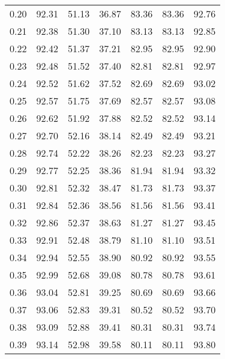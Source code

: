 \begin{tabular}{|c|c|c|c|c|c|c|}
      0.20 &     92.31 &     51.13 &      36.87 &   83.36 &      83.36 &         92.76 \\
      0.21 &     92.38 &     51.30 &      37.10 &   83.13 &      83.13 &         92.85 \\
      0.22 &     92.42 &     51.37 &      37.21 &   82.95 &      82.95 &         92.90 \\
      0.23 &     92.48 &     51.52 &      37.40 &   82.81 &      82.81 &         92.97 \\
      0.24 &     92.52 &     51.62 &      37.52 &   82.69 &      82.69 &         93.02 \\
      0.25 &     92.57 &     51.75 &      37.69 &   82.57 &      82.57 &         93.08 \\
      0.26 &     92.62 &     51.92 &      37.88 &   82.52 &      82.52 &         93.14 \\
      0.27 &     92.70 &     52.16 &      38.14 &   82.49 &      82.49 &         93.21 \\
      0.28 &     92.74 &     52.22 &      38.26 &   82.23 &      82.23 &         93.27 \\
      0.29 &     92.77 &     52.25 &      38.36 &   81.94 &      81.94 &         93.32 \\
      0.30 &     92.81 &     52.32 &      38.47 &   81.73 &      81.73 &         93.37 \\
      0.31 &     92.84 &     52.36 &      38.56 &   81.56 &      81.56 &         93.41 \\
      0.32 &     92.86 &     52.37 &      38.63 &   81.27 &      81.27 &         93.45 \\
      0.33 &     92.91 &     52.48 &      38.79 &   81.10 &      81.10 &         93.51 \\
      0.34 &     92.94 &     52.55 &      38.90 &   80.92 &      80.92 &         93.55 \\
      0.35 &     92.99 &     52.68 &      39.08 &   80.78 &      80.78 &         93.61 \\
      0.36 &     93.04 &     52.81 &      39.25 &   80.69 &      80.69 &         93.66 \\
      0.37 &     93.06 &     52.83 &      39.31 &   80.52 &      80.52 &         93.70 \\
      0.38 &     93.09 &     52.88 &      39.41 &   80.31 &      80.31 &         93.74 \\
      0.39 &     93.14 &     52.98 &      39.58 &   80.11 &      80.11 &         93.80 \\

\end{tabular}
